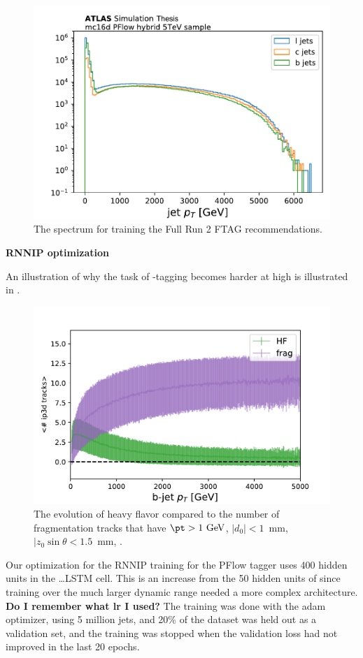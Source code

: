 \begin{figure}[htbp]
  \centering
  \includegraphics[width=.6\textwidth]{figures/ftag/PFlow trainings/pflow-pt-extended-hybrid}
  \caption{The \pt spectrum for training the Full Run 2 FTAG recommendations.}
  \label{fig:pflow-pt-extended-hybrid}
\end{figure}



\textbf{RNNIP optimization}

An illustration of why the task of \Pqb-tagging becomes harder at high \pt is illustrated in \Fig{\ref{fig:hf-ftag-tracks}}.


\begin{figure}[htbp]
  \centering
  \includegraphics[width=.6\textwidth]{figures/ftag/PFlow trainings/hf-frag-tracks}
  \caption{The evolution of heavy flavor compared to the number of fragmentation tracks that have $\pt > 1~\mathrm{GeV}$, $|d_0| < 1$~mm, $|z_0 \sin \theta < 1.5$~mm, .}
  \label{fig:hf-frag-tracks}
\end{figure}


Our optimization for the RNNIP training for the PFlow tagger uses 400 hidden units in the \ldots LSTM cell.
This is an increase from the 50 hidden units of \cite{ATL-PHYS-PUB-2017-003} since training over the much larger dynamic range needed a more complex architecture.
\textbf{Do I remember what lr I used?}
The training was done with the adam optimizer, using 5 million jets, and 20\% of the dataset was held out as a validation set, and the training was stopped when the validation loss had not improved in the last 20 epochs.


